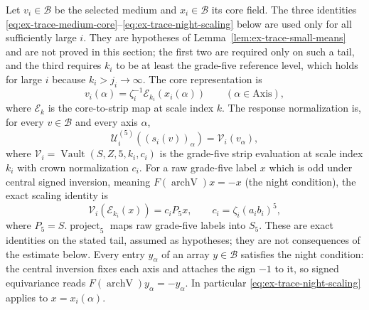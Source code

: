 Let $v_i\in\mathcal B$ be the selected medium and $x_i\in\mathcal B$ its
core field. The three identities
\eqref{eq:ex-trace-medium-core}--\eqref{eq:ex-trace-night-scaling} below
are used only for all sufficiently large $i$. They are hypotheses of
Lemma~\ref{lem:ex-trace-small-means} and are not proved in this section;
the first two are required only on such a tail, and the third requires
$k_i$ to be at least the grade-five reference level, which holds for large
$i$ because $k_i>j_i\to\infty$. The core
representation is
\begin{equation}
 v_i(\alpha)=\zeta_i^{-1}\mathcal E_{k_i}(x_i(\alpha))
 \qquad(\alpha\in\mathrm{Axis}),
 \label{eq:ex-trace-medium-core}
\end{equation}
where $\mathcal E_k$ is the core-to-strip map at scale index $k$. The response
normalization is, for every $v\in\mathcal B$ and every axis $\alpha$,
\begin{equation}
 \mathcal U_i^{(5)}((s_i(v))_\alpha)
       =\mathcal V_i(v_\alpha),
 \label{eq:ex-trace-spun-response}
\end{equation}
where $\mathcal V_i=\operatorname{Vault}(S,Z,5,k_i,c_i)$ is the grade-five
strip evaluation at scale index $k_i$ with crown normalization $c_i$. For
a raw grade-five label $x$ which is odd
under central signed inversion, meaning
$F(\operatorname{archV})x=-x$ (the night condition), the exact scaling
identity is
\begin{equation}
 \mathcal V_i(\mathcal E_{k_i}(x))
   =c_i P_5x,
 \qquad c_i=\zeta_i(a_i b_i)^5,
 \label{eq:ex-trace-night-scaling}
\end{equation}
where $P_5=S.\operatorname{project}_5$ maps raw grade-five labels into
$S_5$. These are exact identities on the stated tail, assumed as
hypotheses; they are not consequences of the estimate below. Every entry $y_\alpha$ of an array $y\in\mathcal B$ satisfies the
night condition: the central inversion fixes each axis and attaches the
sign $-1$ to it, so signed equivariance reads
$F(\operatorname{archV})y_\alpha=-y_\alpha$. In particular
\eqref{eq:ex-trace-night-scaling} applies to $x=x_i(\alpha)$.

